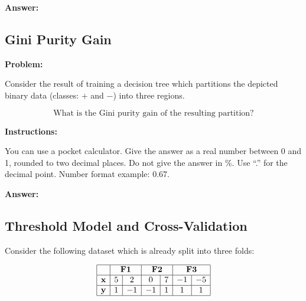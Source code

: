 \documentclass{article}
\begin{document}
\textbf{Answer:}

\subsection*{Gini Purity Gain}

\textbf{Problem:}

Consider the result of training a decision tree which partitions the depicted binary data (classes: \(+\) and \(-\)) into three regions.

\begin{center}
\end{center}
\[
\text{What is the Gini purity gain of the resulting partition?}
\]

\textbf{Instructions:}

You can use a pocket calculator. Give the answer as a real number between 0 and 1, rounded to two decimal places. Do not give the answer in \%. Use ``.'' for the decimal point. Number format example: 0.67.

\textbf{Answer:}



\subsection*{Threshold Model and Cross-Validation}

Consider the following dataset which is already split into three folds:

\[
\begin{array}{|c|c|c|c|c|c|c|}
\hline
 & \multicolumn{2}{c|}{\textbf{F1}} & \multicolumn{2}{c|}{\textbf{F2}} & \multicolumn{2}{c|}{\textbf{F3}} \\ \hline
\textbf{x} & 5 & 2 & 0 & 7 & -1 & -5 \\ \hline
\textbf{y} & 1 & -1 & -1 & 1 & 1 & 1 \\ \hline
\end{array}
\]
\end{document}

